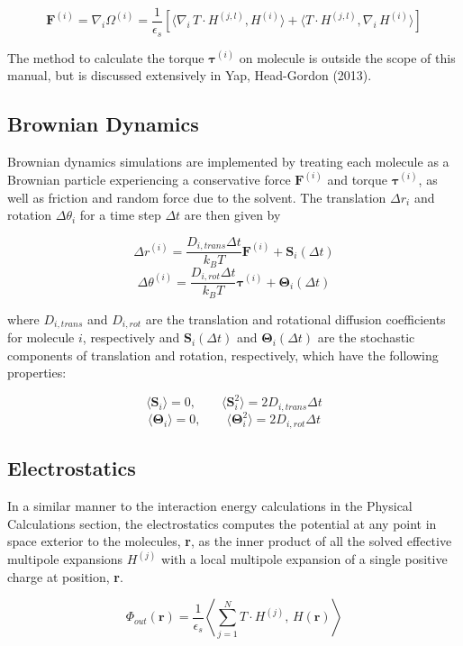 \[ \textbf{F}^{(i)} = \nabla_i \Omega^{(i)}=\frac{1}{\epsilon_s} [ \langle \nabla_i \,T \cdot H^{(j,l) } ,  H^{(i) } \rangle +  \langle T \cdot H^{(j,l) } ,   \nabla_i \, H^{(i) } \rangle ]\]

The method to calculate the torque $\boldsymbol{\tau}^{(i)}$ on molecule is outside the scope of this manual, but is discussed extensively in Yap, Head-Gordon (2013).

\subsection{Brownian Dynamics}

Brownian dynamics simulations are implemented by treating each molecule as a Brownian particle experiencing a conservative force $\textbf{F}^{(i)}$ and torque $\boldsymbol{\tau}^{(i)}$, as well as friction and random force due to the solvent. The translation $\Delta r_i$ and rotation $\Delta \theta_i$ for a time step $\Delta t$ are then given by

\[\Delta r^{(i)} = \frac{D_{i, trans} \Delta t}{k_B T} \textbf{F}^{(i)} + \textbf{S}_i(\Delta t)\]
\[\Delta \theta^{(i)} = \frac{D_{i, rot} \Delta t}{k_B T} \boldsymbol{\tau}^{(i)} + \boldsymbol{\Theta}_i(\Delta t)\]

where $D_{i, trans}$ and $D_{i, rot}$ are the translation and rotational diffusion coefficients for molecule $i$, respectively and $\textbf{S}_i(\Delta t)$ and $\boldsymbol{\Theta}_i(\Delta t)$ are the stochastic components of translation and rotation, respectively, which have the following properties:

\[\langle \textbf{S}_i \rangle=0, \qquad \langle \textbf{S}_i^2 \rangle=2D_{i, trans}\Delta t\]
\[\langle \boldsymbol{\Theta}_i \rangle=0, \qquad \langle \boldsymbol{\Theta}_i^2 \rangle=2D_{i, rot}\Delta t\]

\subsection{Electrostatics}

In a similar manner to the interaction energy calculations in the Physical Calculations section, the electrostatics computes the potential at any point in space exterior to the molecules, \textbf{r}, as the inner product of all the solved effective multipole expansions \(H^{(j)}\) with a local multipole expansion of a single positive charge at position, \textbf{r}.

\[\Phi_{out}(\textbf{r})= \frac{1}{\epsilon_s} \left \langle \sum_{j = 1}^N  T \cdot H^{(j) } , \,  H(\textbf{r})  \right \rangle \]

